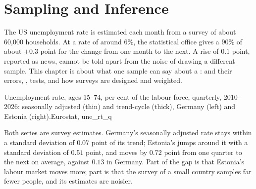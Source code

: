 \chapter{Sampling and Inference}\label{ch:b1:sampling-and-inference}

The US unemployment rate is estimated each month from a survey of about
60,000 households. %
At a rate of around $6\%$, the statistical office gives a $90\%$ 
of about $\pm 0.3$ point for the change from one month to the next. %
A rise of $0.1$ point, reported as news, cannot be told apart from the noise of
drawing a different sample. This chapter is about what one sample can say
about a :  and their errors, ,
tests, and how surveys are designed and weighted.

\begin{openingchart}{Unemployment rate, ages 15--74, per cent of the labour force,
quarterly, 2010--2026: seasonally adjusted (thin) and trend-cycle (thick),
Germany (left) and Estonia (right).}{Eurostat, une\_rt\_q}
\end{openingchart}

Both series are survey estimates. Germany's seasonally adjusted rate stays
within a standard deviation of $0.07$ point of its trend; Estonia's jumps
around it with a standard deviation of $0.51$ point, and moves by $0.72$ point
from one quarter to the next on average, against $0.13$ in Germany. %
Part of the gap is that Estonia's labour market moves more; part is that the
survey of a small country samples far fewer people, and its estimates are
noisier.

